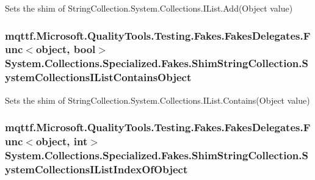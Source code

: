 Sets the shim of String\-Collection.\-System.\-Collections.\-I\-List.\-Add(\-Object value)

\hypertarget{class_system_1_1_collections_1_1_specialized_1_1_fakes_1_1_shim_string_collection_ac1821e5540a539b47b5e03b63fe61663}{
\subsubsection[{System\-Collections\-I\-List\-Contains\-Object}]{\setlength{\rightskip}{0pt plus 5cm}mqttf.\-Microsoft.\-Quality\-Tools.\-Testing.\-Fakes.\-Fakes\-Delegates.\-Func$<$object, bool$>$ System.\-Collections.\-Specialized.\-Fakes.\-Shim\-String\-Collection.\-System\-Collections\-I\-List\-Contains\-Object\hspace{0.3cm}{\ttfamily [set]}}}\label{class_system_1_1_collections_1_1_specialized_1_1_fakes_1_1_shim_string_collection_ac1821e5540a539b47b5e03b63fe61663}


Sets the shim of String\-Collection.\-System.\-Collections.\-I\-List.\-Contains(\-Object value)

\hypertarget{class_system_1_1_collections_1_1_specialized_1_1_fakes_1_1_shim_string_collection_a3970ac4743055ed185b5ad21a0e0efdd}{
\subsubsection[{System\-Collections\-I\-List\-Index\-Of\-Object}]{\setlength{\rightskip}{0pt plus 5cm}mqttf.\-Microsoft.\-Quality\-Tools.\-Testing.\-Fakes.\-Fakes\-Delegates.\-Func$<$object, int$>$ System.\-Collections.\-Specialized.\-Fakes.\-Shim\-String\-Collection.\-System\-Collections\-I\-List\-Index\-Of\-Object\hspace{0.3cm}{\ttfamily [set]}}}\label{class_system_1_1_collections_1_1_specialized_1_1_fakes_1_1_shim_string_collection_a3970ac4743055ed185b5ad21a0e0efdd}


